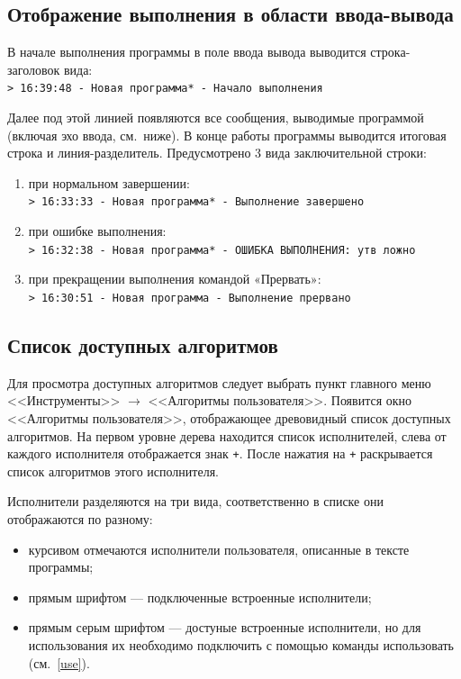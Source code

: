 \subsection{Отображение выполнения в области ввода-вывода}
\label{io-run}

В начале выполнения программы в поле ввода вывода выводится строка-заголовок вида:\\
\texttt{> 16:39:48 - Новая программа* - Начало выполнения}

Далее под этой линией появляются все сообщения, выводимые программой (включая эхо ввода, см.~ниже). В конце работы программы выводится итоговая строка и линия-разделитель. Предусмотрено 3 вида заключительной строки:
\begin{enumerate}
\item при нормальном завершении:\\
\texttt{> 16:33:33 - Новая программа* - Выполнение завершено}
	
\item при ошибке выполнения:\\
\texttt{> 16:32:38 - Новая программа* - ОШИБКА ВЫПОЛНЕНИЯ: утв ложно}

\item при прекращении выполнения командой «Прервать»:\\
\texttt{> 16:30:51 - Новая программа - Выполнение прервано}
\end{enumerate}

\subsection{Список доступных алгоритмов}
\label{useralgs}

Для просмотра доступных алгоритмов следует выбрать пункт главного меню <<Инструменты>> $\to$ <<Алгоритмы пользователя>>. Появится окно <<Алгоритмы пользователя>>, отображающее древовидный список доступных алгоритмов. На первом уровне дерева находится список исполнителей, слева от каждого исполнителя отображается знак \texttt{+}. После нажатия на \texttt{+} раскрывается список алгоритмов этого исполнителя.

Исполнители разделяются на три вида, соответственно в списке они отображаются по разному:
\begin{itemize}
\item курсивом отмечаются исполнители пользователя, описанные в тексте программы;
\item прямым шрифтом --- подключенные встроенные исполнители;
\item прямым серым шрифтом --- достуные встроенные исполнители, но для использования их необходимо подключить с помощью команды \textsf{использовать} (см.~\ref{use}).
\end{itemize}


